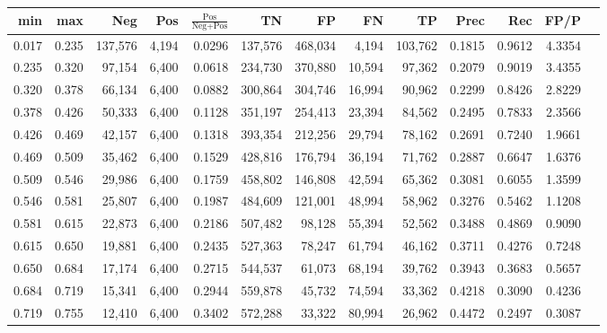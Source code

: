 \begin{tabular}{rrrrrrrrrrrrr}
\toprule
  min &   max &     Neg &   Pos & $\frac{\text{Pos}}{\text{Neg}+\text{Pos}}$ &      TN &      FP &      FN &      TP &   Prec &    Rec &   FP/P \\
\midrule
0.017 & 0.235 & 137,576 & 4,194 &                                     0.0296 & 137,576 & 468,034 &   4,194 & 103,762 & 0.1815 & 0.9612 & 4.3354 \\
0.235 & 0.320 &  97,154 & 6,400 &                                     0.0618 & 234,730 & 370,880 &  10,594 &  97,362 & 0.2079 & 0.9019 & 3.4355 \\
0.320 & 0.378 &  66,134 & 6,400 &                                     0.0882 & 300,864 & 304,746 &  16,994 &  90,962 & 0.2299 & 0.8426 & 2.8229 \\
0.378 & 0.426 &  50,333 & 6,400 &                                     0.1128 & 351,197 & 254,413 &  23,394 &  84,562 & 0.2495 & 0.7833 & 2.3566 \\
0.426 & 0.469 &  42,157 & 6,400 &                                     0.1318 & 393,354 & 212,256 &  29,794 &  78,162 & 0.2691 & 0.7240 & 1.9661 \\
0.469 & 0.509 &  35,462 & 6,400 &                                     0.1529 & 428,816 & 176,794 &  36,194 &  71,762 & 0.2887 & 0.6647 & 1.6376 \\
0.509 & 0.546 &  29,986 & 6,400 &                                     0.1759 & 458,802 & 146,808 &  42,594 &  65,362 & 0.3081 & 0.6055 & 1.3599 \\
0.546 & 0.581 &  25,807 & 6,400 &                                     0.1987 & 484,609 & 121,001 &  48,994 &  58,962 & 0.3276 & 0.5462 & 1.1208 \\
0.581 & 0.615 &  22,873 & 6,400 &                                     0.2186 & 507,482 &  98,128 &  55,394 &  52,562 & 0.3488 & 0.4869 & 0.9090 \\
0.615 & 0.650 &  19,881 & 6,400 &                                     0.2435 & 527,363 &  78,247 &  61,794 &  46,162 & 0.3711 & 0.4276 & 0.7248 \\
0.650 & 0.684 &  17,174 & 6,400 &                                     0.2715 & 544,537 &  61,073 &  68,194 &  39,762 & 0.3943 & 0.3683 & 0.5657 \\
0.684 & 0.719 &  15,341 & 6,400 &                                     0.2944 & 559,878 &  45,732 &  74,594 &  33,362 & 0.4218 & 0.3090 & 0.4236 \\
0.719 & 0.755 &  12,410 & 6,400 &                                     0.3402 & 572,288 &  33,322 &  80,994 &  26,962 & 0.4472 & 0.2497 & 0.3087 \\

\end{tabular}
